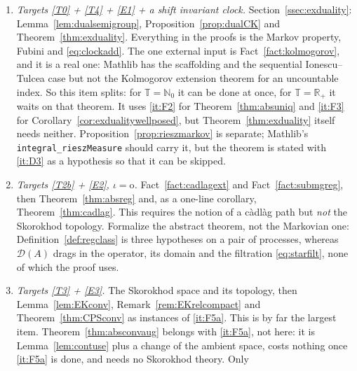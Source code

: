 \documentclass[11pt,a4paper]{article}
\theoremstyle{plain}
\theoremstyle{definition}
\theoremstyle{remark}
\newcommand{\R}{\mathbb{R}}
\newcommand{\N}{\mathbb{N}}
\newcommand{\Rp}{\R_+}
\newcommand{\T}{\mathbb{T}}                     %
\newcommand{\dom}{\mathcal{D}}                 %
\begin{document}
\begin{enumerate}[label=\textbf{(F\arabic*)}]
  Lemma~\ref{lem:calculus}, Theorem~\ref{thm:duality} with $\alpha$ and $\beta$,
  Corollaries~\ref{cor:dualrel} and \ref{cor:dualstopped}, and
  Corollary~\ref{cor:atomless} for a clock of infinite mass.  Uniqueness is
  obtained by the route of Remark~\ref{rem:dualnonmarkov}, without a shift
  system, rather than through Corollary~\ref{cor:uniqviadual}; as a test, it
  gives a second proof of the one dimensional laws of Brownian motion.
\item \label{it:F3b}
  \emph{Targets \eqref{T0} + \eqref{T4} + \eqref{E1} + a shift invariant clock.}
  Section~\ref{ssec:exduality}: Lemma~\ref{lem:dualsemigroup},
  Proposition~\ref{prop:dualCK} and Theorem~\ref{thm:exduality}.  Everything in
  the proofs is the Markov property, Fubini and \eqref{eq:clockadd}.  The one
  external input is Fact~\ref{fact:kolmogorov}, and it is a real one: Mathlib has
  the scaffolding and the sequential Ionescu--Tulcea case but not the Kolmogorov
  extension theorem for an uncountable index.  So this item splits: for
  $\T = \N_0$ it can be done at once, for $\T = \Rp$ it waits on that theorem.
  It uses \ref{it:F2} for Theorem~\ref{thm:absuniq} and \ref{it:F3} for
  Corollary~\ref{cor:exdualitywellposed}, but Theorem~\ref{thm:exduality} itself
  needs neither.  Proposition~\ref{prop:rieszmarkov} is separate; Mathlib's
  \texttt{integral\_rieszMeasure} should carry it, but the theorem is stated with
  \ref{it:D3} as a hypothesis so that it can be skipped.
\item \label{it:F4}
  \emph{Targets \eqref{T2b} + \eqref{E2}, $\iota = \mathrm{o}$.}
  Fact~\ref{fact:cadlagext} and Fact~\ref{fact:submgreg}, then
  Theorem~\ref{thm:absreg} and, as a one-line corollary,
  Theorem~\ref{thm:cadlag}.  This requires the notion of a c\`adl\`ag path but
  \emph{not} the Skorokhod topology.  Formalize the abstract theorem, not the
  Markovian one: Definition~\ref{def:regclass} is three hypotheses on a pair of
  processes, whereas $\dom(A)$ drags in the operator, its domain and the
  filtration \eqref{eq:starfilt}, none of which the proof uses.
\item \label{it:F5b}
  \emph{Targets \eqref{T3} + \eqref{E3}.}
  The Skorokhod space and its topology, then Lemma~\ref{lem:EKconv},
  Remark~\ref{rem:EKrelcompact} and Theorem~\ref{thm:CPSconv} as instances of
  \ref{it:F5a}.  This is by far the largest item.
  Theorem~\ref{thm:absconvaug} belongs with \ref{it:F5a}, not here: it is
  Lemma~\ref{lem:contuse} plus a change of the ambient space, costs nothing once
  \ref{it:F5a} is done, and needs no Skorokhod theory.  Only

\end{enumerate}
\end{document}

